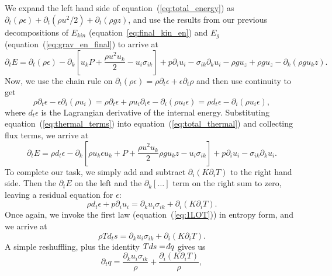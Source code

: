 \documentclass[letterpaper,12pt]{paper}
\def\dbar{{\mathchar'26\mkern-12mu d}}
\begin{document}
We expand the left hand side of equation~(\ref{eq:total_energy}) as
$\partial_t (\rho \epsilon) + \partial_t (\rho u^2/2) + \partial_t
(\rho g z)$, and use the results from our previous decompositions of
$E_{kin}$ (equation~\ref{eq:final_kin_en}) and $E_{g}$
(equation~(\ref{eq:grav_en_final}) to arrive at
\begin{equation}
  \label{eq:total_thermal}
\partial_t E = \partial_t (\rho \epsilon) - \partial_k \left[ u_k P + \frac{\rho u^2 u_k}{2} -
  u_i \sigma_{ik} \right] + p \partial_i u_i - \sigma_{ik} \partial_k
u_i - \rho g u_z + \rho g u_z - \partial_k (\rho g u_k z).
\end{equation}
Now, we use the chain rule on $\partial_t (\rho \epsilon) =
\rho \partial_t \epsilon + \epsilon \partial_t \rho$ and then use
continuity to get 
\begin{equation}
  \label{eq:thermal_terms}
  \rho \partial_t \epsilon - \epsilon \partial_i (\rho u_i) =
  \rho \partial_t \epsilon + \rho u_i \partial_i \epsilon - \partial_i
  (\rho u_i \epsilon) = \rho d_t \epsilon - \partial_i (\rho u_i \epsilon),
\end{equation}
where $d_t \epsilon$ is the Lagrangian derivative of the internal
energy. Substituting equation~(\ref{eq:thermal_terms}) into
equation~(\ref{eq:total_thermal}) and collecting flux terms, we arrive
at
\begin{equation}
  \label{eq:nearly_final_energy}
\partial_t E = \rho d_t \epsilon - \partial_k \left[ \rho u_k
  \epsilon u_k +  P + \frac{\rho u^2 u_k}{2} \rho g u_k z -
  u_i \sigma_{ik} \right] + p \partial_i u_i - \sigma_{ik} \partial_k
u_i.
\end{equation}
To complete our task, we simply add and subtract $\partial_i
(K \partial_i T)$ to the right hand side. Then the $\partial_t E$ on the
left and the $\partial_k [\ldots ]$ term on the right sum to zero,
leaving a residual equation for $\epsilon$:
\begin{equation}
  \label{eq:residual_eps}
  \rho d_t \epsilon + p \partial_i u_i = \partial_k u_i \sigma_{ik}
  + \partial_i (K \partial_i T).
\end{equation}
Once again, we invoke the first law (equation~(\ref{eq:1LOT})) in
entropy form, and we arrive at 
\begin{equation}
  \label{eq:final_entropy}
  \rho T d_t s = \partial_k u_i \sigma_{ik}
  + \partial_i (K \partial_i T).
\end{equation}
A simple reshuffling, plus the identity $T ds = \dbar q$ gives us 
\begin{equation}
  \label{eq:heat_dt}
  \partial_t q = \frac{\partial_k u_i \sigma_{ik}}{\rho}
  + \frac{\partial_i (K \partial_i T)}{\rho},
\end{equation}
\end{document}
